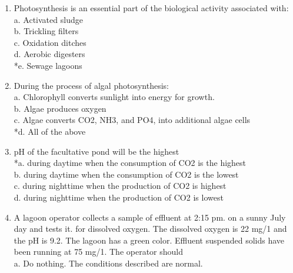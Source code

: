 \begin{enumerate}
\item  Photosynthesis is an essential part of the biological activity associated with:\\


a. Activated sludge \\

b. Trickling filters \\

c. Oxidation ditches \\

d. Aerobic digesters \\

*e. Sewage lagoons \\


\item  During the process of algal photosynthesis:\\


a. Chlorophyll converts sunlight into energy for growth. \\

b. Algae produces oxygen \\

c. Algae converts CO2, NH3, and PO4, into additional algae cells \\

*d. All of the above \\


\item  pH of the facultative pond will be the highest\\


*a. during daytime when the consumption of CO2 is the highest \\

b. during daytime when the consumption of CO2 is the lowest \\

c. during nighttime when the production of CO2 is highest \\

d. during nighttime when the production of CO2 is lowest \\


\item  A lagoon operator collects a sample of effluent at 2:15 pm. on a sunny July day and tests it. for dissolved oxygen. The dissolved oxygen is 22 mg/1 and the pH is 9.2.  The lagoon has a green color. Effluent suspended solids have been running at 75 mg/1.  The operator should \\


a. Do nothing. The conditions described are normal. \\


\end{enumerate}
